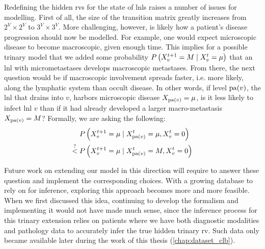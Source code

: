 \documentclass[\relativeRoot/main.tex]{subfiles}
\begin{document}
Redefining the hidden \glspl{rv} for the state of \glspl{lnl} raises a number of issues for modelling. First of all, the size of the transition matrix greatly increases from $2^V \times 2^V$ to $3^V \times 3^V$. More challenging, however, is likely how a patient's disease progression should now be modelled. For example, one would expect microscopic disease to become macroscopic, given enough time. This implies for a possible trinary model that we added some probability $P \left( X^{t+1}_v=M \mid X_v^t=\mu \right)$ that an \gls{lnl} with micrometastases develops macroscopic metastases. From there, the next question would be if macroscopic involvement spreads faster, i.e. more likely, along the lymphatic system than occult disease. In other words, if level $\operatorname{pa}(v)$, the \gls{lnl} that drains into $v$, harbors microscopic disease $X_{\operatorname{pa}(v)} = \mu$, is it less likely to infect \gls{lnl} $v$ than if it had already developed a larger macro-metastasis $X_{\operatorname{pa}(v)} = M$? Formally, we are asking the following:
%
\begin{equation}
    \begin{aligned}
        &P \left( X^{t+1}_v = \mu \mid X^t_{\operatorname{pa}(v)}=\mu, X_v^t=0 \right) \\
        \stackrel{?}{<} \; &P \left( X^{t+1}_v = \mu \mid X^t_{\operatorname{pa}(v)}=M, X_v^t=0 \right)
    \end{aligned}
\end{equation}

Future work on extending our model in this direction will require to answer these question and implement the corresponding choices. With a growing database to rely on for inference, exploring this approach becomes more and more feasible. When we first discussed this idea, continuing to develop the formalism and implementing it would not have made much sense, since the inference process for this trinary extension relies on patients where we have both diagnostic modalities and pathology data to accurately infer the true hidden trinary \gls{rv}. Such data only became available later during the work of this thesis (\cref{chap:dataset_clb}).
\end{document}
